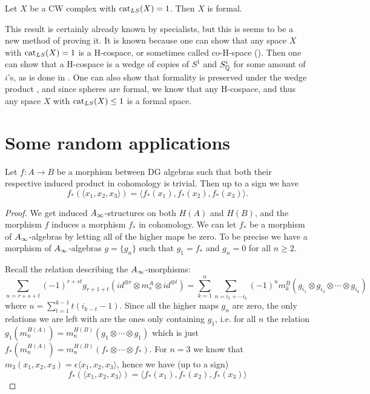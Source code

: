 \begin{corollary}
Let $X$ be a CW complex with $\text{cat}_{LS}(X)=1$. Then $X$ is formal. 
\end{corollary}

This result is certainly already known by specialists, but this is seems to be a new method of proving it. It is known because one can show that any space $X$ with $\text{cat}_{LS}(X)=1$ is a H-cospace, or sometimes called co-H-space (\cite{hess}). Then one can show that a H-cospace is a wedge of copies of $S^1$ and $S_{\mathbb{Q}}^i$ for some amount of $i$'s, as is done in \cite[Theorem 3.]{co-H-space}. One can also show that formality is preserved under the wedge product \cite{hess}, and since spheres are formal, we know that any H-cospace, and thus any space $X$ with $\text{cat}_{LS}(X)\leq 1$ is a formal space. 



\iffalse

\section{Some random applications}

\begin{proposition}
Let $f\colon A\longrightarrow B$ be a morphism between DG algebras such that both their respective induced product in cohomology is trivial. Then up to a sign we have
\begin{equation*}
    f_*(\langle x_1, x_2, x_3\rangle) = \langle f_*(x_1), f_*(x_2),  f_*(x_3)\rangle.
\end{equation*}
\end{proposition}
\begin{proof}
We get induced $A_{\infty}$-structures on both $H(A)$ and $H(B)$, and the morphism $f$ induces a morphism $f_*$ in cohomology. We can let $f_*$ be a morphism of $A_{\infty}$-algebras by letting all of the higher maps be zero. To be precise we have a morphism of $A_{\infty}$-algebras $g = \{g_n\}$ such that $g_1 = f_*$ and $g_n=0$ for all $n\geq 2$. 

Recall the relation describing the $A_{\infty}$-morphisms:
\begin{equation*}
    \sum_{n = r+s+t}(-1)^{r+st}g_{r+1+t}(id^{\otimes r}\otimes m_s^A \otimes id^{\otimes t}) = \sum_{k=1}^{n}\sum_{n=i_1+\cdots i_k}(-1)^{u} m_k^B(g_{i_1}\otimes g_{i_2}\otimes \cdots \otimes g_{i_k})
\end{equation*}
where $u=\displaystyle \sum_{t=1}^{k-1}t(i_{k-t}-1)$. Since all the higher maps $g_n$ are zero, the only relations we are left with are the ones only containing $g_1$, i.e. for all $n$ the relation $g_1(m_n^{H(A)}) = m_n^{H(B)}(g_1\otimes \cdots \otimes g_1)$ which is just $f_*(m_n^{H(A)}) = m_n^{H(B)}(f_*\otimes \cdots \otimes f_*)$. For $n=3$ we know that $m_3(x_1, x_2, x_3) = \epsilon \langle x_1, x_2, x_3\rangle$, hence we have (up to a sign)
\begin{equation*}
    f_*(\langle x_1, x_2, x_3\rangle) = \langle f_*(x_1), f_*(x_2),  f_*(x_3)\rangle
\end{equation*}
\end{proof}


